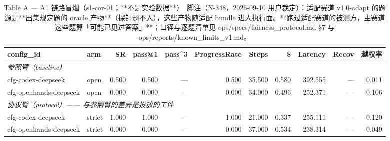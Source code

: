 \begin{table}[t]
\centering
\caption{Table A — A1 链路冒烟（s1-cor-01；**不是实验数据**）　脚注（N-348，2026-09-10 用户裁定）：适配赛道 v1.0-adapt 的题源是**出集规定题的 oracle 产物**（探针题不入），这些产物随适配 bundle 进入执行面。**跑过适配赛道的被测方，主赛道这些题算「可能已见过答案」**；口径与逐题清单见 ops/specs/fairness\_protocol.md §7 与 ops/reports/known\_limits\_v1.md。}
\label{tab:a-a1}
\begin{tabular}{llrrrrrrrrr}
\toprule
config\_id & arm & SR & pass@1 & pass\^{}3 & ProgressRate & Steps & \$ & Latency & Recov & 越权率 \\
\midrule
\multicolumn{11}{l}{\textit{参照臂（baseline）}} \\
cfg-codex-deepseek & open & 0.500 & 0.500 & --- & 0.500 & 35.500 & 0.580 & 392.555 & --- & 0.011 \\
cfg-openhands-deepseek & open & 0.000 & 0.000 & --- & 0.000 & 34.000 & 0.496 & 252.371 & --- & 0.106 \\
\midrule
\multicolumn{11}{l}{\textit{协议臂（protocol）—— 与参照臂的差异是投放的工件}} \\
cfg-codex-deepseek & strict & 1.000 & 1.000 & --- & 1.000 & 21.000 & 0.337 & 255.111 & --- & 0.120 \\
cfg-openhands-deepseek & strict & 0.000 & 0.000 & --- & 0.000 & 37.000 & 0.534 & 238.314 & --- & 0.049 \\
\bottomrule
\end{tabular}
\end{table}

